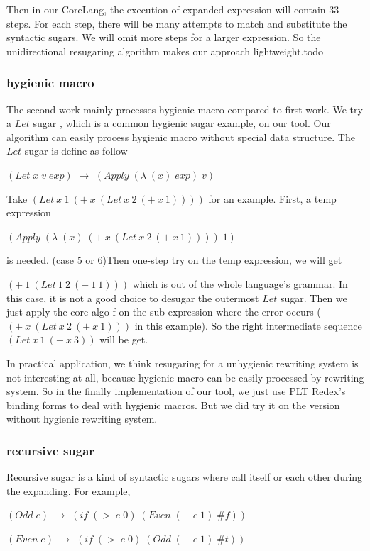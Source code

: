 Then in our CoreLang, the execution of expanded expression will contain 33 steps. For each step, there will be many attempts to match and substitute the syntactic sugars. We will omit more steps for a larger expression. So the unidirectional resugaring algorithm makes our approach lightweight.todo

\subsubsection{hygienic macro}
\label{mark:hygienic}

The second work\cite{hygienic} mainly processes hygienic macro compared to first work. We try a $Let$ sugar , which is a common hygienic sugar example, on our tool. Our algorithm can easily process hygienic macro without special data structure. The $Let$ sugar is define as follow

$(Let\;x\;v\;exp)$ $\rightarrow$ $(Apply\;(\lambda\;(x)\;exp)\;v)$

Take $(Let~x~1~(+~x~(Let~x~2~(+~x~1))))$ for an example. First, a temp expression

$(Apply\;(\lambda\;(x)\;(+~x~(Let~x~2~(+~x~1))))\;1)$

is needed. (case 5 or 6)Then one-step try on the temp expression, we will get

$(+~1~(Let~1~2~(+~1~1)))$ which is out of the whole language's grammar. In this case, it is not a good choice to desugar the outermost $Let$ sugar. Then we just apply the core-algo f on the sub-expression where the error occurs ($(+~x~(Let~x~2~(+~x~1)))$ in this example). So the right intermediate sequence $(Let~x~1~(+~x~3))$ will be get.

In practical application, we think resugaring for a unhygienic rewriting system is not interesting at all, because hygienic macro can be easily processed by rewriting system. So in the finally implementation of our tool, we just use PLT Redex's binding forms to deal with hygienic macros. But we did try it on the version without hygienic rewriting system.

\subsubsection{recursive sugar}
Recursive sugar is a kind of syntactic sugars where call itself or each other during the expanding. For example,

$(Odd\;e)$ $\rightarrow$ $(if\;(>\;e\;0)\;(Even\;(-\;e\;1)\;\#f))$

$(Even\;e)$ $\rightarrow$ $(if\;(>\;e\;0)\;(Odd\;(-\;e\;1)\;\#t))$

